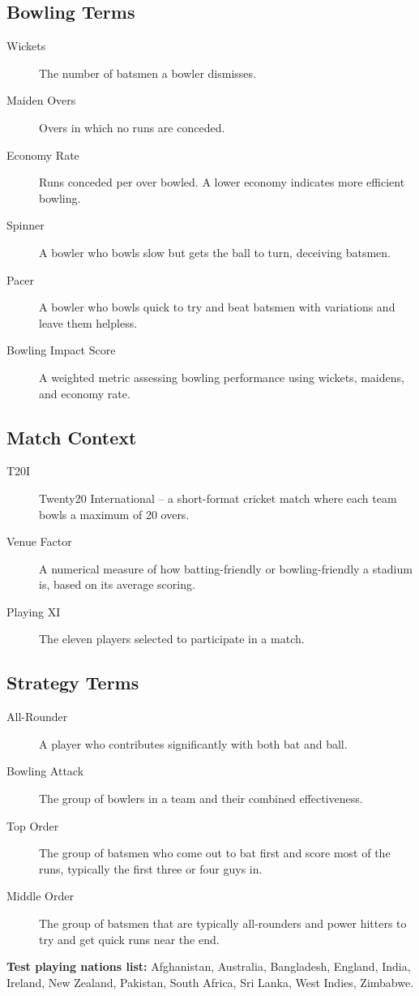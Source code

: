\documentclass{article}[12pt]
\begin{document}
\begin{appendices}
\subsection*{Bowling Terms}
\begin{description}
  \item[Wickets] The number of batsmen a bowler dismisses.
  \item[Maiden Overs] Overs in which no runs are conceded.
  \item[Economy Rate] Runs conceded per over bowled. A lower economy indicates more efficient bowling.
  \item[Spinner] A bowler who bowls slow but gets the ball to turn, deceiving batsmen.
  \item[Pacer] A bowler who bowls quick to try and beat batsmen with variations and leave them helpless.
  \item[Bowling Impact Score] A weighted metric assessing bowling performance using wickets, maidens, and economy rate.
\end{description}

\subsection*{Match Context}
\begin{description}
  \item[T20I] Twenty20 International – a short-format cricket match where each team bowls a maximum of 20 overs.
  \item[Venue Factor] A numerical measure of how batting-friendly or bowling-friendly a stadium is, based on its average scoring.
  \item[Playing XI] The eleven players selected to participate in a match.
\end{description}

\subsection*{Strategy Terms}
\begin{description}
  \item[All-Rounder] A player who contributes significantly with both bat and ball.
  \item[Bowling Attack] The group of bowlers in a team and their combined effectiveness.
  \item[Top Order] The group of batsmen who come out to bat first and score most of the runs, typically the first three or four guys in.
  \item[Middle Order] The group of batsmen that are typically all-rounders and power hitters to try and get quick runs near the end.
  
\end{description}



\textbf{Test playing nations list:} Afghanistan,
Australia,
Bangladesh,
England,
India,
Ireland,
New Zealand,
Pakistan,
South Africa,
Sri Lanka,
West Indies,
Zimbabwe.



\end{appendices}
\end{document}
